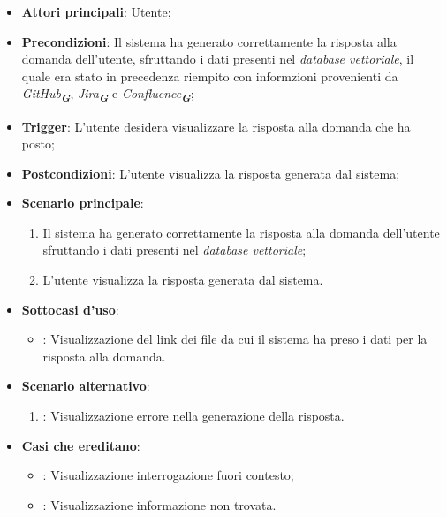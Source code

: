 \begin{itemize}
    \item \textbf{Attori principali}: Utente;
    \item \textbf{Precondizioni}: Il sistema ha generato correttamente la risposta alla domanda dell'utente, sfruttando i dati
    presenti nel \emph{database vettoriale}, il quale era stato in precedenza riempito con informzioni provenienti da \emph{GitHub}\textsubscript{\textbf{\textit{G}}}, 
    \emph{Jira}\textsubscript{\textbf{\textit{G}}} e \emph{Confluence}\textsubscript{\textbf{\textit{G}}};
    \item \textbf{Trigger}: L'utente desidera visualizzare la risposta alla domanda che ha posto;
    \item \textbf{Postcondizioni}: L'utente visualizza la risposta generata dal sistema;
    \item \textbf{Scenario principale}:
    \begin{enumerate}
        \item Il sistema ha generato correttamente la risposta alla domanda dell'utente sfruttando i dati presenti nel \emph{database vettoriale};
        \item L'utente visualizza la risposta generata dal sistema.
    \end{enumerate}
    \item \textbf{Sottocasi d'uso}:
    \begin{itemize}
        \item {}: Visualizzazione del link dei file da cui il sistema ha preso i dati per la risposta alla domanda.
    \end{itemize}
    \item \textbf{Scenario alternativo}:
    \begin{enumerate}
        \item {}: Visualizzazione errore nella generazione della risposta.
    \end{enumerate}
    \item \textbf{Casi che ereditano}:
    \begin{itemize}
        \item {}: Visualizzazione interrogazione fuori contesto;
        \item {}: Visualizzazione informazione non trovata.
    \end{itemize}
\end{itemize}

